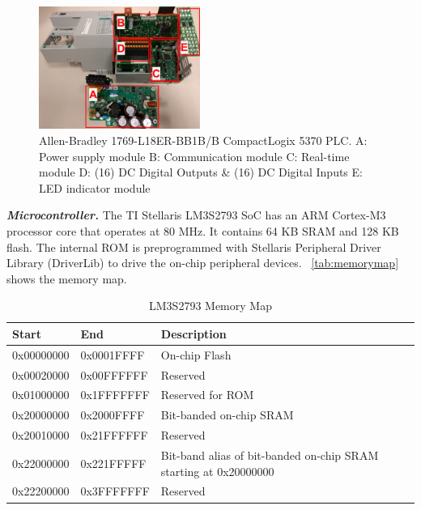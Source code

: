 \begin{figure}[th]
	\includegraphics[width=0.47\textwidth]{figures/modules}
	\centering
	\caption{Allen-Bradley 1769-L18ER-BB1B/B CompactLogix 5370 PLC. A: Power supply module  B: Communication module  C: Real-time module  D: (16) DC Digital Outputs \& (16) DC Digital Inputs  E: LED indicator module}
	\label{fig:modules}
\end{figure}




\textbf{\textit{Microcontroller.}} The TI Stellaris LM3S2793 SoC has an ARM Cortex-M3 processor core that operates at 80 MHz. It contains 64 KB SRAM and 128 KB flash. The internal ROM is preprogrammed with Stellaris Peripheral Driver Library (DriverLib) to drive the on-chip peripheral devices. ~\autoref{tab:memorymap} shows the memory map. 


\begin{center}
	\begin{table}
		\begin{tabular}{|p{1.6cm} p{1.6cm} p{4cm}|} 
			\hline
			Start & End & Description \\ [0.5ex] 
			\hline
			0x00000000 & 0x0001FFFF & On-chip Flash \\ 
			\hline
			0x00020000 & 0x00FFFFFF & Reserved \\
			\hline
			0x01000000 & 0x1FFFFFFF & Reserved for ROM \\
			\hline
			0x20000000 & 0x2000FFFF & Bit-banded on-chip SRAM \\
			\hline
			0x20010000 & 0x21FFFFFF & Reserved \\
			\hline
			0x22000000 & 0x221FFFFF & Bit-band alias of bit-banded on-chip SRAM starting at 0x20000000 \\
			\hline
			0x22200000 & 0x3FFFFFFF & Reserved \\
			\hline
		\end{tabular}
		\caption{LM3S2793 Memory Map}
		\label{tab:memorymap}
	\end{table}
\end{center}



